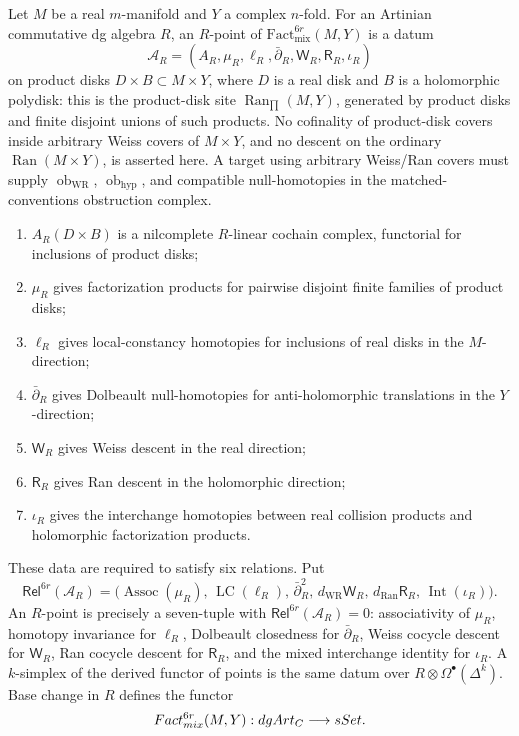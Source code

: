 \begin{defn}\label{defn:mixed-dunn-fact6r-datum}
  Let \(M\) be a real \(m\)-manifold and \(Y\) a complex \(n\)-fold.  For
  an Artinian commutative dg algebra \(R\), an \(R\)-point of
  \(\mathrm{Fact}^{6r}_{\mathrm{mix}}(M,Y)\) is a datum
  \[
    \mathcal A_R=
    (A_R,\mu_R,\ell_R,\bar\partial_R,\mathsf W_R,\mathsf R_R,\iota_R)
  \]
  on product disks \(D\times B\subset M\times Y\), where \(D\) is a
  real disk and \(B\) is a holomorphic polydisk:
  this is the product-disk site
  \(\operatorname{Ran}_{\prod}(M,Y)\), generated by product disks and
  finite disjoint unions of such products.  No cofinality of product-disk
  covers inside arbitrary Weiss covers of \(M\times Y\), and no descent
  on the ordinary \(\operatorname{Ran}(M\times Y)\), is asserted here.
  A target using arbitrary Weiss/Ran covers must supply
  \(\operatorname{ob}_{\mathrm{WR}}\),
  \(\operatorname{ob}_{\mathrm{hyp}}\), and compatible
  null-homotopies in the matched-conventions obstruction complex.
  \begin{enumerate}[label=(\roman*)]
    \item \(A_R(D\times B)\) is a nilcomplete \(R\)-linear cochain
      complex, functorial for inclusions of product disks;
    \item \(\mu_R\) gives factorization products for pairwise disjoint
      finite families of product disks;
    \item \(\ell_R\) gives local-constancy homotopies for inclusions of
      real disks in the \(M\)-direction;
    \item \(\bar\partial_R\) gives Dolbeault null-homotopies for
      anti-holomorphic translations in the \(Y\)-direction;
    \item \(\mathsf W_R\) gives Weiss descent in the real direction;
    \item \(\mathsf R_R\) gives Ran descent in the holomorphic direction;
    \item \(\iota_R\) gives the interchange homotopies between real
      collision products and holomorphic factorization products.
  \end{enumerate}
  These data are required to satisfy six relations.  Put
  \[
  \mathsf{Rel}^{6r}(\mathcal A_R)=
  \bigl(
    \operatorname{Assoc}(\mu_R),\,
    \operatorname{LC}(\ell_R),\,
    \bar\partial_R^2,\,
    d_{\mathrm{WR}}\mathsf W_R,\,
    d_{\mathrm{Ran}}\mathsf R_R,\,
    \operatorname{Int}(\iota_R)
  \bigr).
  \]
  An \(R\)-point is precisely a seven-tuple with
  \(\mathsf{Rel}^{6r}(\mathcal A_R)=0\): associativity of \(\mu_R\),
  homotopy invariance for \(\ell_R\), Dolbeault closedness for
  \(\bar\partial_R\), Weiss cocycle descent for \(\mathsf W_R\), Ran
  cocycle descent for \(\mathsf R_R\), and the mixed interchange
  identity for \(\iota_R\).  A \(k\)-simplex of the
  derived functor of points is the same datum over
  \(R\otimes\Omega^\bullet(\Delta^k)\).  Base change in \(R\) defines
  the functor
  \[
    Fact^{6r}_{mix}(M,Y):
    dgArt_{C}\longrightarrow sSet.
  \]


\end{defn}
